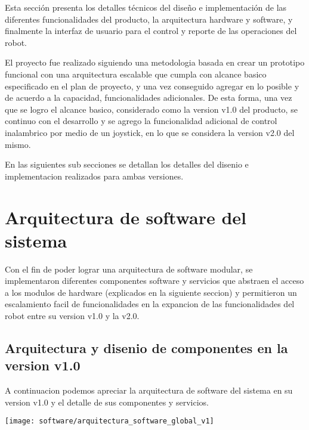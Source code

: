 
Esta sección presenta los detalles técnicos del diseño e implementación de las diferentes funcionalidades del producto, la arquitectura hardware y software, y finalmente la interfaz de usuario para el control y reporte de las operaciones del robot.

El proyecto fue realizado siguiendo una metodologia basada en crear un prototipo funcional con una arquitectura escalable que cumpla con alcance basico especificado en el plan de proyecto, y una vez conseguido agregar en lo posible y de acuerdo a la capacidad, funcionalidades adicionales.
De esta forma, una vez que se logro el alcance basico, considerado como la version v1.0 del producto, se continuo con el desarrollo y se agrego la funcionalidad adicional de control inalambrico por medio de un joystick, en lo que se considera la version v2.0 del mismo.

En las siguientes sub secciones se detallan los detalles del disenio e implementacion realizados para ambas versiones.



\section{Arquitectura de software del sistema}

Con el fin de poder lograr una arquitectura de software modular, se implementaron diferentes componentes software y servicios que abstraen el acceso a los modulos de hardware (explicados en la siguiente seccion) y permitieron un escalamiento facil de funcionalidades en la expancion de las funcionalidades del robot entre su version v1.0 y la v2.0.


\subsection{Arquitectura y disenio de componentes en la version v1.0}

A continuacion podemos apreciar la arquitectura de software del sistema en su version v1.0 y el detalle de sus componentes y servicios.

\begin{center}
  \texttt{[image: software/arquitectura\_software\_global\_v1]}
    \label{fig:arquitectura_software_global}

\end{center}


